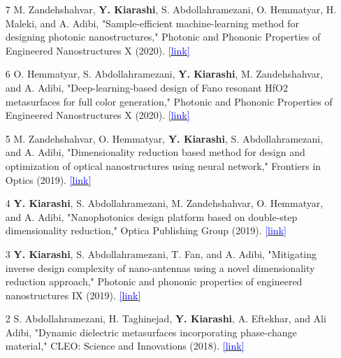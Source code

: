 \documentclass[margin, line]{res}
\newenvironment{list1}{
  \begin{list}{\ding{113}}{%
      \setlength{\itemsep}{0in}
      \setlength{\parsep}{0in} \setlength{\parskip}{0in}
      \setlength{\topsep}{0in} \setlength{\partopsep}{0in} 
      \setlength{\leftmargin}{0.17in}}}{\end{list}}
\begin{document}
\begin{resume}
\begin{list1}
\begin{itemize}
\item [7] M. Zandehshahvar, \textbf{Y. Kiarashi}, S. Abdollahramezani, O. Hemmatyar, H. Maleki, and A. Adibi, "Sample-efficient machine-learning method for designing photonic nanostructures," Photonic and Phononic Properties of Engineered Nanostructures X
(2020). \href{https://www.spiedigitallibrary.org/conference-proceedings-of-spie/11289/112890F/Deep-learning-based-design-of-Fano-resonant-HfO2-metasurfaces-for/10.1117/12.2554907.short}{\textcolor{blue}{[link]}}

\item [6] O. Hemmatyar, S. Abdollahramezani, \textbf{Y. Kiarashi}, M. Zandehshahvar, and A. Adibi, "Deep-learning-based design of Fano resonant HfO2 metasurfaces for full color generation," Photonic and Phononic Properties of Engineered Nanostructures X
(2020). \href{https://www.spiedigitallibrary.org/conference-proceedings-of-spie/11289/112890F/Deep-learning-based-design-of-Fano-resonant-HfO2-metasurfaces-for/10.1117/12.2554907.short}{\textcolor{blue}{[link]}}

\item [5] M. Zandehshahvar, O. Hemmatyar, \textbf{Y.  Kiarashi}, S. Abdollahramezani, and A. Adibi, "Dimensionality reduction based method for design and optimization of optical nanostructures using neural network," Frontiers in Optics
(2019). \href{https://opg.optica.org/abstract.cfm?uri=FiO-2019-FM5C.2}{\textcolor{blue}{[link]}}

\item [4] \textbf{Y. Kiarashi}, S. Abdollahramezani, M. Zandehshahvar, O. Hemmatyar, and A. Adibi, "Nanophotonics design platform based on double-step dimensionality reduction," Optica Publishing Group
(2019). \href{https://opg.optica.org/abstract.cfm?uri=LS-2019-JTu3A.4}{\textcolor{blue}{[link]}}

\item [3] \textbf{Y.  Kiarashi}, S. Abdollahramezani, T. Fan, and A. Adibi, "Mitigating inverse design complexity of nano-antennas using a novel dimensionality reduction approach," Photonic and phononic properties of engineered nanostructures IX
(2019). \href{https://www.spiedigitallibrary.org/conference-proceedings-of-spie/10927/109270C/Mitigating-inverse-design-complexity-of-nano-antennas-using-a-novel/10.1117/12.2517651.short}{\textcolor{blue}{[link]}}

\item [2] S. Abdollahramezani, H. Taghinejad, \textbf{Y. Kiarashi}, A. Eftekhar, and Ali Adibi, "Dynamic dielectric metasurfaces incorporating phase-change material," CLEO: Science and Innovations (2018). \href{https://opg.optica.org/abstract.cfm?uri=cleo_si-2018-SF1J.1}{\textcolor{blue}{[link]}}


\end{itemize}
\end{list1}
\end{resume}
\end{document}
